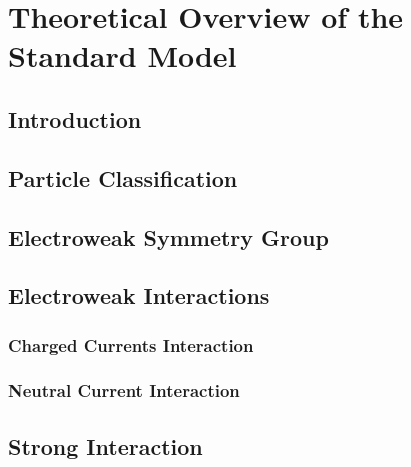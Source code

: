 \documentclass[10pt,twoside,cucitura,classica,openany]{toptesi}
\begin{document}


\chapter{Theoretical Overview of the Standard Model}
\label{cha:theoretical-overview}

\section{Introduction}
\label{sec:introduction}



\section{Particle Classification}
\label{sec:standard-model}



\section{Electroweak Symmetry Group}
\label{sec:electro-weak-symm}



\section{Electroweak Interactions}
\label{sec:electro-weak-inter}



\subsection{Charged Currents Interaction}
\label{sec:charg-curr-inter}



\subsection{Neutral Current Interaction}
\label{sec:neutr-curr-inter}



\section{Strong Interaction}
\label{sec:strong-int}
\end{document}
